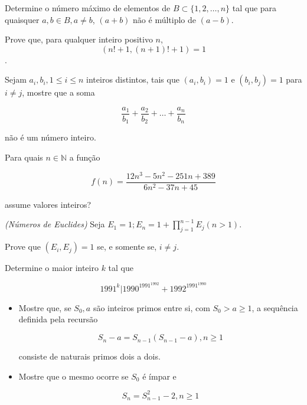 \begin{questao}
  Determine o número máximo de elementos de $B \subset \{1,2,\ldots,n\}$ tal que
  para quaisquer $ a,b \in B, a \not = b$, $(a+b)$ não é múltiplo de $(a-b)$.
\end{questao}

\begin{questao}
  Prove que, para qualquer inteiro positivo $n$,
  $$ (n!+1, (n+1)!+1) = 1 $$.
\end{questao}

\begin{questao}
  Sejam $a_i, b_i, 1 \leq i \leq n$ inteiros distintos, tais que $(a_i,b_i) = 1$
  e $(b_i,b_j) = 1$ para $i \not= j$, mostre que a soma

  $$ \frac{a_1}{b_1} +  \frac{a_2}{b_2} + \ldots + \frac{a_n}{b_n} $$

  não é um número inteiro.
\end{questao}

\begin{questao}
  Para quais $n \in \mathbb{N}$ a função

  $$ f(n)=\frac{12n^3-5n^2-251n+389}{6n^2-37n+45} $$

  assume valores inteiros?
\end{questao}

\begin{questao}
  {\it (Números de Euclides)} Seja
  $E_1=1; E_n = 1+\prod_{j=1}^{n-1}{E_j} (n>1)$.

  Prove que $(E_i,E_j) = 1$ se, e somente se, $i \not= j$.
\end{questao}

\begin{questao}
  Determine o maior inteiro $k$ tal que 

  $$ 1991^k | 1990^{1991^{1992}} + 1992^{1991^{1990}} $$
\end{questao}

\begin{questao}

  \begin{itemize}
    \item Mostre que, se $S_0,a$ são inteiros primos entre si, com $S_0 > a \geq 1$,
    a sequência definida pela recursão

    $$ S_n-a = S_{n-1}(S_{n-1}-a), n \geq 1 $$

    consiste de naturais primos dois a dois.

    \item Mostre que o mesmo ocorre se $S_0$ é ímpar e

    $$ S_n=S_{n-1}^2-2, n \geq 1 $$
  \end{itemize}
\end{questao}

